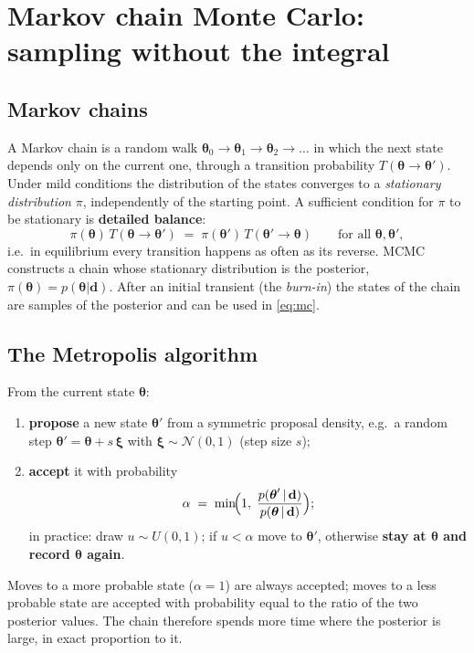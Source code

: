 \documentclass[11pt,a4paper]{article}
\newcommand{\vth}{\boldsymbol{\theta}}
\newcommand{\vd}{\mathbf{d}}
\begin{document}
\section{Markov chain Monte Carlo: sampling without the integral}\label{sec:mcmc}

\subsection{Markov chains}
A Markov chain is a random walk $\vth_0\to\vth_1\to\vth_2\to\dots$ in which the next state depends only on
the current one, through a transition probability $T(\vth\to\vth')$. Under mild conditions the distribution of
the states converges to a \emph{stationary distribution} $\pi$, independently of the starting point. A
sufficient condition for $\pi$ to be stationary is \textbf{detailed balance}:
\begin{equation}
  \pi(\vth)\,T(\vth\to\vth') \;=\; \pi(\vth')\,T(\vth'\to\vth)\qquad\text{for all }\vth,\vth' ,
  \label{eq:db}
\end{equation}
i.e.\ in equilibrium every transition happens as often as its reverse. MCMC constructs a chain whose stationary
distribution is the posterior, $\pi(\vth)=p(\vth|\vd)$. After an initial transient (the \emph{burn-in}) the
states of the chain are samples of the posterior and can be used in \eqref{eq:mc}.

\subsection{The Metropolis algorithm}\label{sec:metropolis}
From the current state $\vth$:
\begin{enumerate}
\item \textbf{propose} a new state $\vth'$ from a symmetric proposal density, e.g.\ a random step
  $\vth'=\vth+s\,\boldsymbol{\xi}$ with $\boldsymbol{\xi}\sim\mathcal{N}(0,1)$ (step size $s$);
\item \textbf{accept} it with probability
  \begin{equation}
    \alpha \;=\; \min\!\Bigl(1,\;\frac{p(\vth'\,|\,\vd)}{p(\vth\,|\,\vd)}\Bigr);
    \label{eq:alpha}
  \end{equation}
  in practice: draw $u\sim U(0,1)$; if $u<\alpha$ move to $\vth'$, otherwise \textbf{stay at $\vth$ and record
  $\vth$ again}.
\end{enumerate}
Moves to a more probable state ($\alpha=1$) are always accepted; moves to a less probable state are accepted
with probability equal to the ratio of the two posterior values. The chain therefore spends more time where the
posterior is large, in exact proportion to it.
\end{document}
